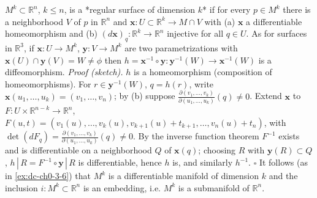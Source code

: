 \begin{example}
  \label{ex:dc-ch0-4-2}
  \notready
  $M^k\subset\mathbb{R}^n$, $k\le n$, is a *regular surface of dimension $k$* if for
  every $p\in M^k$ there is a neighborhood $V$ of $p$ in $\mathbb{R}^n$ and
  $\mathbf{x}:U\subset\mathbb{R}^k\to M\cap V$ with (a) $\mathbf{x}$ a
  differentiable homeomorphism and (b) $(d\mathbf{x})_q:\mathbb{R}^k\to\mathbb{R}^n$
  injective for all $q\in U$. As for surfaces in $\mathbb{R}^3$, if
  $\mathbf{x}:U\to M^k$, $\mathbf{y}:V\to M^k$ are two parametrizations with
  $\mathbf{x}(U)\cap\mathbf{y}(V)=W\neq\phi$ then
  $h=\mathbf{x}^{-1}\circ\mathbf{y}:\mathbf{y}^{-1}(W)\to\mathbf{x}^{-1}(W)$ is a
  diffeomorphism.
  \emph{Proof (sketch).} $h$ is a homeomorphism (composition of homeomorphisms). For
  $r\in\mathbf{y}^{-1}(W)$, $q=h(r)$, write
  $\mathbf{x}(u_1,\dots,u_k)=(v_1,\dots,v_n)$; by (b) suppose
  $\frac{\partial(v_1,\dots,v_k)}{\partial(u_1,\dots,u_k)}(q)\neq0$. Extend
  $\mathbf{x}$ to $F:U\times\mathbb{R}^{n-k}\to\mathbb{R}^n$,
  $F(u,t)=(v_1(u),\dots,v_k(u),v_{k+1}(u)+t_{k+1},\dots,v_n(u)+t_n)$, with
  $\det(dF_q)=\frac{\partial(v_1,\dots,v_k)}{\partial(u_1,\dots,u_k)}(q)\neq0$. By
  the inverse function theorem $F^{-1}$ exists and is differentiable on a
  neighborhood $Q$ of $\mathbf{x}(q)$; choosing $R$ with $\mathbf{y}(R)\subset Q$,
  $h\,|\,R=F^{-1}\circ\mathbf{y}\,|\,R$ is differentiable, hence $h$ is, and
  similarly $h^{-1}$. $\square$ It follows (as in \cref{ex:dc-ch0-3-6}) that $M^k$ is a
  differentiable manifold of dimension $k$ and the inclusion
  $i:M^k\subset\mathbb{R}^n$ is an embedding, i.e. $M^k$ is a submanifold of
  $\mathbb{R}^n$.
\end{example}

